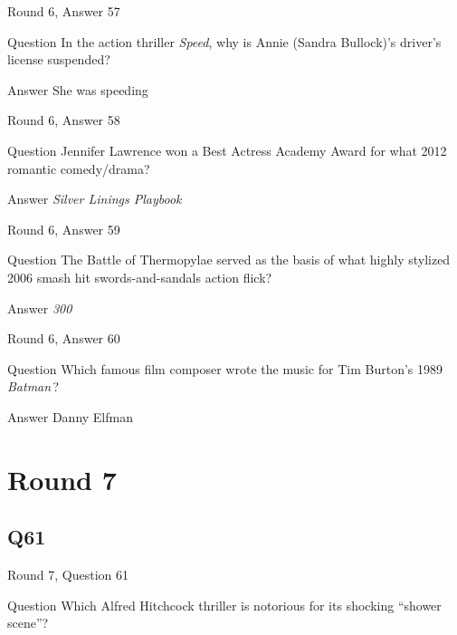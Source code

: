 \documentclass[11pt]{beamer}
\begin{document}
\begin{frame}[t]{Round 6, Answer 57}
\vspace{2em}
\begin{block}{Question}
In the action thriller \emph{Speed}, why is Annie (Sandra Bullock)'s driver's license suspended?
\end{block}
\pause{}
\begin{block}{Answer}
She was speeding
\end{block}
\end{frame}
    

\begin{frame}[t]{Round 6, Answer 58}
\vspace{2em}
\begin{block}{Question}
Jennifer Lawrence won a Best Actress Academy Award for what 2012 romantic comedy/drama?
\end{block}
\pause{}
\begin{block}{Answer}
\emph{Silver Linings Playbook}
\end{block}
\end{frame}
    

\begin{frame}[t]{Round 6, Answer 59}
\vspace{2em}
\begin{block}{Question}
The Battle of Thermopylae served as the basis of what highly stylized 2006 smash hit swords-and-sandals action flick?
\end{block}
\pause{}
\begin{block}{Answer}
\emph{300}
\end{block}
\end{frame}
    

\begin{frame}[t]{Round 6, Answer 60}
\vspace{2em}
\begin{block}{Question}
Which famous film composer wrote the music for Tim Burton's 1989 \emph{Batman}\,?
\end{block}
\pause{}
\begin{block}{Answer}
Danny Elfman
\end{block}
\end{frame}
    

\section{Round 7}
    

\subsection*{Q61}
\begin{frame}[t]{Round 7, Question 61}
\vspace{2em}
\begin{block}{Question}
Which Alfred Hitchcock thriller is notorious for its shocking ``shower scene''?
\end{block}
\end{frame}
    
\end{document}
